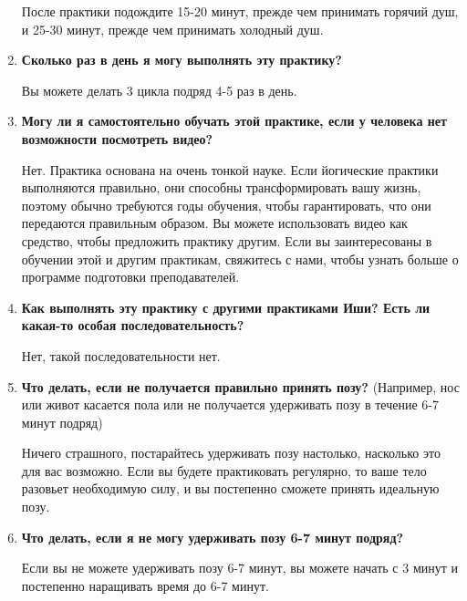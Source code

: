 \documentclass[
a4paper, %
12pt, %
article,
onecolumn, %
openany, %
]{memoir}
\begin{document}
\begin{enumerate}
После практики подождите 15-20 минут, прежде чем принимать горячий душ, и 25-30
минут, прежде чем принимать холодный душ.

\item \textbf{Сколько раз в день я могу выполнять эту практику?}

Вы можете делать 3 цикла подряд 4-5 раз в день.
\item \textbf{Могу ли я самостоятельно обучать этой практике, если у человека нет возможности посмотреть видео?}

Нет. Практика основана на очень тонкой науке. Если йогические практики выполняются
правильно, они способны трансформировать вашу жизнь, поэтому обычно требуются
годы обучения, чтобы гарантировать, что они передаются правильным образом. Вы
можете использовать видео как средство, чтобы предложить практику другим. Если вы
заинтересованы в обучении этой и другим практикам, свяжитесь с нами, чтобы узнать
больше о программе подготовки преподавателей.
\item \textbf{Как выполнять эту практику с другими практиками Иши? Есть ли какая-то особая последовательность?}

Нет, такой последовательности нет.
\item \textbf{Что делать, если не получается правильно принять позу?}
(Например, нос или живот касается пола или не получается удерживать позу в течение
6-7 минут подряд)

Ничего страшного, постарайтесь удерживать позу настолько, насколько это для вас
возможно. Если вы будете практиковать регулярно, то ваше тело разовьет
необходимую силу, и вы постепенно сможете принять идеальную позу.

\item \textbf{Что делать, если я не могу удерживать позу 6-7 минут подряд?}

Если вы не можете удерживать позу 6-7 минут, вы можете начать с 3 минут и
постепенно наращивать время до 6-7 минут.



\end{enumerate}
\end{document}
